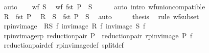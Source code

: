 \begin{isabellebody}
\ auto\isanewline
\ \ \isamarkupfalse%
\ {\isacartoucheopen}wf\ S{\isacartoucheclose}\ \isamarkupfalse%
\ {\isachardoublequoteopen}wf\ {\isacharparenleft}{\kern0pt}fst\ P\ {\isasymunion}\ S{\isacharparenright}{\kern0pt}{\isachardoublequoteclose}\isanewline
\ \ \ \ \isamarkupfalse%
\ {\isacharparenleft}{\kern0pt}auto\ intro{\isacharcolon}{\kern0pt}\ wf{\isacharunderscore}{\kern0pt}union{\isacharunderscore}{\kern0pt}compatible{\isacharparenright}{\kern0pt}\isanewline
\ \ \isamarkupfalse%
\ \isamarkupfalse%
\ {\isacartoucheopen}R\ {\isasymsubseteq}\ fst\ P{\isacartoucheclose}\ \isamarkupfalse%
\ {\isachardoublequoteopen}R\ {\isasymunion}\ S\ {\isasymsubseteq}\ fst\ P\ {\isasymunion}\ S{\isachardoublequoteclose}\ \isamarkupfalse%
\ auto\isanewline
\ \ \isamarkupfalse%
\ \isamarkupfalse%
\ {\isacharquery}{\kern0pt}thesis\ \isamarkupfalse%
\ {\isacharparenleft}{\kern0pt}rule\ wf{\isacharunderscore}{\kern0pt}subset{\isacharparenright}{\kern0pt}\isanewline
{}\isamarkupfalse%
%
\endisatagproof
{\isafoldproof}%
%
\isadelimproof
\isanewline
%
\endisadelimproof
\isanewline
{}\isamarkupfalse%
\ {\isachardoublequoteopen}rp{\isacharunderscore}{\kern0pt}inv{\isacharunderscore}{\kern0pt}image\ {\isacharequal}{\kern0pt}\ {\isacharparenleft}{\kern0pt}{\isasymlambda}{\isacharparenleft}{\kern0pt}R{\isacharcomma}{\kern0pt}S{\isacharparenright}{\kern0pt}\ f{\isachardot}{\kern0pt}\ {\isacharparenleft}{\kern0pt}inv{\isacharunderscore}{\kern0pt}image\ R\ f{\isacharcomma}{\kern0pt}\ inv{\isacharunderscore}{\kern0pt}image\ S\ f{\isacharparenright}{\kern0pt}{\isacharparenright}{\kern0pt}{\isachardoublequoteclose}\isanewline
\isanewline
{}\isamarkupfalse%
\ rp{\isacharunderscore}{\kern0pt}inv{\isacharunderscore}{\kern0pt}image{\isacharunderscore}{\kern0pt}rp{\isacharcolon}{\kern0pt}\ {\isachardoublequoteopen}reduction{\isacharunderscore}{\kern0pt}pair\ P\ {\isasymLongrightarrow}\ reduction{\isacharunderscore}{\kern0pt}pair\ {\isacharparenleft}{\kern0pt}rp{\isacharunderscore}{\kern0pt}inv{\isacharunderscore}{\kern0pt}image\ P\ f{\isacharparenright}{\kern0pt}{\isachardoublequoteclose}\isanewline
%
\isadelimproof
\ \ %
\endisadelimproof
%
\isatagproof
{}\isamarkupfalse%
\ reduction{\isacharunderscore}{\kern0pt}pair{\isacharunderscore}{\kern0pt}def\ rp{\isacharunderscore}{\kern0pt}inv{\isacharunderscore}{\kern0pt}image{\isacharunderscore}{\kern0pt}def\ split{\isacharunderscore}{\kern0pt}def\ \isamarkupfalse%

\end{isabellebody}
